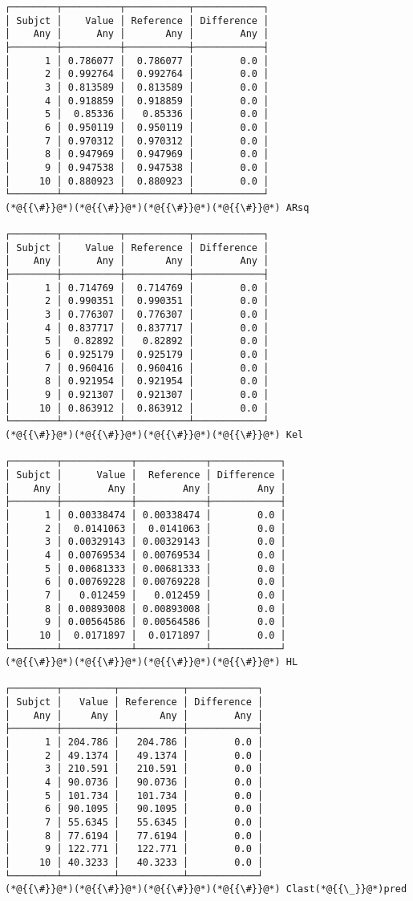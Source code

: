 \documentclass[12pt,a4paper]{article}
\begin{document}
\begin{lstlisting}
┌────────┬──────────┬───────────┬────────────┐
│ Subjct │    Value │ Reference │ Difference │
│    Any │      Any │       Any │        Any │
├────────┼──────────┼───────────┼────────────┤
│      1 │ 0.786077 │  0.786077 │        0.0 │
│      2 │ 0.992764 │  0.992764 │        0.0 │
│      3 │ 0.813589 │  0.813589 │        0.0 │
│      4 │ 0.918859 │  0.918859 │        0.0 │
│      5 │  0.85336 │   0.85336 │        0.0 │
│      6 │ 0.950119 │  0.950119 │        0.0 │
│      7 │ 0.970312 │  0.970312 │        0.0 │
│      8 │ 0.947969 │  0.947969 │        0.0 │
│      9 │ 0.947538 │  0.947538 │        0.0 │
│     10 │ 0.880923 │  0.880923 │        0.0 │
└────────┴──────────┴───────────┴────────────┘
(*@{{\#}}@*)(*@{{\#}}@*)(*@{{\#}}@*)(*@{{\#}}@*) ARsq

┌────────┬──────────┬───────────┬────────────┐
│ Subjct │    Value │ Reference │ Difference │
│    Any │      Any │       Any │        Any │
├────────┼──────────┼───────────┼────────────┤
│      1 │ 0.714769 │  0.714769 │        0.0 │
│      2 │ 0.990351 │  0.990351 │        0.0 │
│      3 │ 0.776307 │  0.776307 │        0.0 │
│      4 │ 0.837717 │  0.837717 │        0.0 │
│      5 │  0.82892 │   0.82892 │        0.0 │
│      6 │ 0.925179 │  0.925179 │        0.0 │
│      7 │ 0.960416 │  0.960416 │        0.0 │
│      8 │ 0.921954 │  0.921954 │        0.0 │
│      9 │ 0.921307 │  0.921307 │        0.0 │
│     10 │ 0.863912 │  0.863912 │        0.0 │
└────────┴──────────┴───────────┴────────────┘
(*@{{\#}}@*)(*@{{\#}}@*)(*@{{\#}}@*)(*@{{\#}}@*) Kel

┌────────┬────────────┬────────────┬────────────┐
│ Subjct │      Value │  Reference │ Difference │
│    Any │        Any │        Any │        Any │
├────────┼────────────┼────────────┼────────────┤
│      1 │ 0.00338474 │ 0.00338474 │        0.0 │
│      2 │  0.0141063 │  0.0141063 │        0.0 │
│      3 │ 0.00329143 │ 0.00329143 │        0.0 │
│      4 │ 0.00769534 │ 0.00769534 │        0.0 │
│      5 │ 0.00681333 │ 0.00681333 │        0.0 │
│      6 │ 0.00769228 │ 0.00769228 │        0.0 │
│      7 │   0.012459 │   0.012459 │        0.0 │
│      8 │ 0.00893008 │ 0.00893008 │        0.0 │
│      9 │ 0.00564586 │ 0.00564586 │        0.0 │
│     10 │  0.0171897 │  0.0171897 │        0.0 │
└────────┴────────────┴────────────┴────────────┘
(*@{{\#}}@*)(*@{{\#}}@*)(*@{{\#}}@*)(*@{{\#}}@*) HL

┌────────┬─────────┬───────────┬────────────┐
│ Subjct │   Value │ Reference │ Difference │
│    Any │     Any │       Any │        Any │
├────────┼─────────┼───────────┼────────────┤
│      1 │ 204.786 │   204.786 │        0.0 │
│      2 │ 49.1374 │   49.1374 │        0.0 │
│      3 │ 210.591 │   210.591 │        0.0 │
│      4 │ 90.0736 │   90.0736 │        0.0 │
│      5 │ 101.734 │   101.734 │        0.0 │
│      6 │ 90.1095 │   90.1095 │        0.0 │
│      7 │ 55.6345 │   55.6345 │        0.0 │
│      8 │ 77.6194 │   77.6194 │        0.0 │
│      9 │ 122.771 │   122.771 │        0.0 │
│     10 │ 40.3233 │   40.3233 │        0.0 │
└────────┴─────────┴───────────┴────────────┘
(*@{{\#}}@*)(*@{{\#}}@*)(*@{{\#}}@*)(*@{{\#}}@*) Clast(*@{{\_}}@*)pred


\end{lstlisting}
\end{document}
